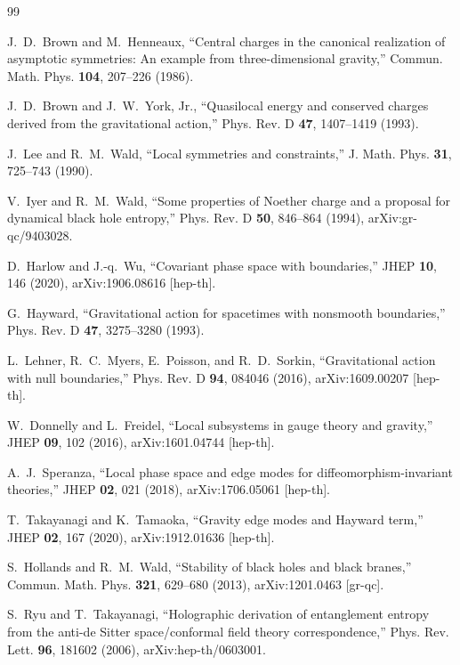 \begin{thebibliography}{99}

J.~D.~Brown and M.~Henneaux,
“Central charges in the canonical realization of asymptotic symmetries: An example from three-dimensional gravity,”
Commun. Math. Phys. \textbf{104}, 207--226 (1986).

J.~D.~Brown and J.~W.~York, Jr.,
“Quasilocal energy and conserved charges derived from the gravitational action,”
Phys. Rev. D \textbf{47}, 1407--1419 (1993).

J.~Lee and R.~M.~Wald,
“Local symmetries and constraints,”
J. Math. Phys. \textbf{31}, 725--743 (1990).

V.~Iyer and R.~M.~Wald,
“Some properties of Noether charge and a proposal for dynamical black hole entropy,”
Phys. Rev. D \textbf{50}, 846--864 (1994),
arXiv:gr-qc/9403028.

D.~Harlow and J.-q.~Wu,
“Covariant phase space with boundaries,”
JHEP \textbf{10}, 146 (2020),
arXiv:1906.08616 [hep-th].

G.~Hayward,
“Gravitational action for spacetimes with nonsmooth boundaries,”
Phys. Rev. D \textbf{47}, 3275--3280 (1993).

L.~Lehner, R.~C.~Myers, E.~Poisson, and R.~D.~Sorkin,
“Gravitational action with null boundaries,”
Phys. Rev. D \textbf{94}, 084046 (2016),
arXiv:1609.00207 [hep-th].

W.~Donnelly and L.~Freidel,
“Local subsystems in gauge theory and gravity,”
JHEP \textbf{09}, 102 (2016),
arXiv:1601.04744 [hep-th].

A.~J.~Speranza,
“Local phase space and edge modes for diffeomorphism-invariant theories,”
JHEP \textbf{02}, 021 (2018),
arXiv:1706.05061 [hep-th].

T.~Takayanagi and K.~Tamaoka,
“Gravity edge modes and Hayward term,”
JHEP \textbf{02}, 167 (2020),
arXiv:1912.01636 [hep-th].

S.~Hollands and R.~M.~Wald,
“Stability of black holes and black branes,”
Commun. Math. Phys. \textbf{321}, 629--680 (2013),
arXiv:1201.0463 [gr-qc].

S.~Ryu and T.~Takayanagi,
“Holographic derivation of entanglement entropy from the anti-de Sitter space/conformal field theory correspondence,”
Phys. Rev. Lett. \textbf{96}, 181602 (2006),
arXiv:hep-th/0603001.


\end{thebibliography}
